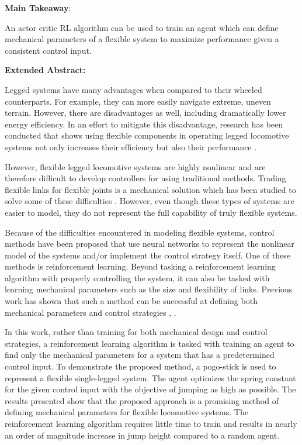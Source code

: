\vspace{10pt}
{\footnotesize{\tir
\begin{center}
    \textbf{Main Takeaway}: \\ 
\end{center}

An actor critic RL algorithm can be used to train an agent which can define mechanical parameters of a flexible system to maximize performance given a consistent control input.

\begin{center}
    \textbf{Extended Abstract:}
\end{center}

Legged systems have many advantages when compared to their wheeled counterparts. For example, they can more easily navigate extreme, uneven terrain. However, there are disadvantages as well, including dramatically lower energy efficiency. In an effort to mitigate this disadvantage, research has been conducted that shows using flexible components in operating legged locomotive systems not only increases their efficiency but also their performance \cite{Sugiyama2004}.

However, flexible legged locomotive systems are highly nonlinear and are therefore difficult to develop controllers for using traditional methods. Trading flexible links for flexible joints is a mechanical solution which has been studied to solve some of these difficulties \cite{Ghorbel1990}. However, even though these types of systems are easier to model, they do not represent the full capability of truly flexible systems. 

Because of the difficulties encountered in modeling flexible systems, control methods have been proposed that use neural networks to represent the nonlinear model of the systems and/or implement the control strategy itself. One of these methods is reinforcement learning. Beyond tasking a reinforcement learning algorithm with properly controlling the system, it can also be tasked with learning mechanical parameters such as the size and flexibility of links. Previous work has shown that such a method can be successful at defining both mechanical parameters and control strategies \cite{Schaff2019e}, \cite{Ha2019j}.

In this work, rather than training for both mechanical design and control strategies, a reinforcement learning algorithm is tasked with training an agent to find only the mechanical parameters for a system that has a predetermined control input. To demonstrate the proposed method, a pogo-stick is used to represent a flexible single-legged system. The agent optimizes the spring constant for the given control input \cite{Vaughan2013} with the objective of jumping as high as possible. The results presented show that the proposed approach is a promising method of defining mechanical parameters for flexible locomotive systems. The reinforcement learning algorithm requires little time to train and results in nearly an order of magnitude increase in jump height compared to a random agent. 

}}
